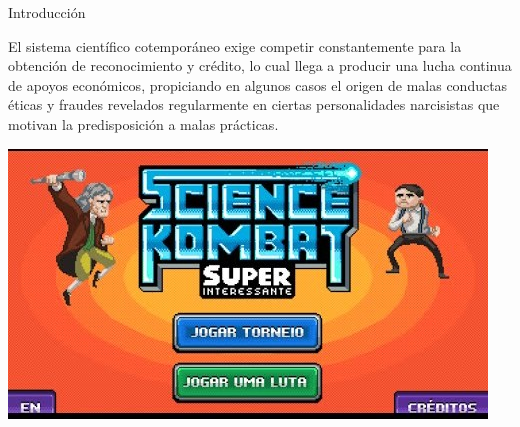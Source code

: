 \begin{frame}{Introducción}
    \begin{minipage}{0.45\linewidth}
        El sistema científico cotemporáneo exige competir constantemente para la obtención de reconocimiento y crédito, lo cual llega a producir una lucha
continua de apoyos económicos, propiciando en algunos casos el origen de malas conductas éticas y fraudes revelados regularmente en ciertas personalidades
narcisistas que motivan la predisposición a malas prácticas.\\
    \end{minipage}
    \hspace{0.5cm}
    \begin{minipage}{0.4\linewidth}
        \centering
        \includegraphics[scale=0.45]{images/ima3.jpg}
    \end{minipage}
\end{frame}